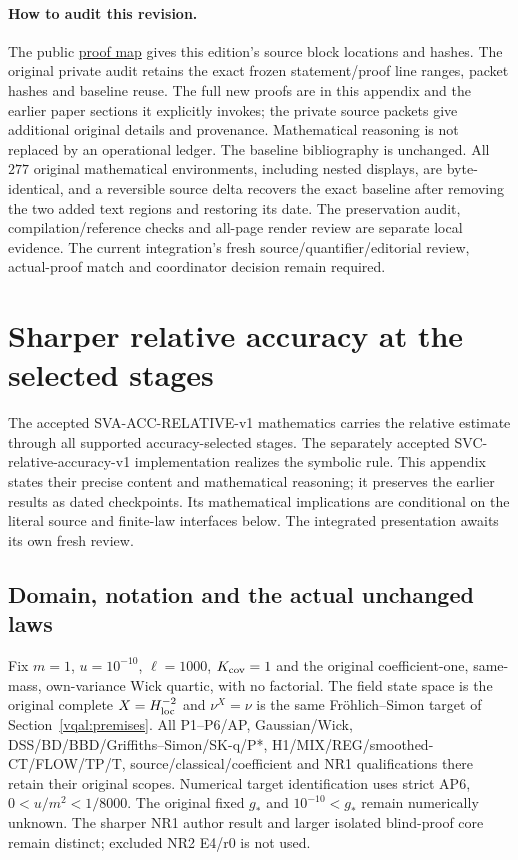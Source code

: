 \documentclass[11pt]{article}
\theoremstyle{plain}
\theoremstyle{definition}
\theoremstyle{remark}
\begin{document}
\paragraph{How to audit this revision.}
The public \href{run:PROOF-MAP.md}{proof map} gives this edition's source
block locations and hashes. The original private audit retains the exact
frozen statement/proof line ranges, packet hashes and baseline reuse. The full new proofs are in this appendix and the earlier
paper sections it explicitly invokes; the private source packets give
additional original details and provenance. Mathematical reasoning is
not replaced by an operational ledger. The baseline bibliography is
unchanged. All $277$ original mathematical environments, including
nested displays, are byte-identical, and a reversible source delta
recovers the exact baseline after removing the two added text regions
and restoring its date. The preservation audit, compilation/reference
checks and all-page render review are separate local evidence. The
current integration's fresh source/quantifier/editorial review,
actual-proof match and coordinator decision remain required.

\clearpage
\section{Sharper relative accuracy at the selected stages}
\label{sva:current}

The accepted SVA-ACC-RELATIVE-v1 mathematics carries the relative estimate
through all supported accuracy-selected stages. The separately accepted
SVC-relative-accuracy-v1 implementation realizes the symbolic rule.
This appendix states their precise content and mathematical reasoning;
it preserves the earlier results as dated checkpoints. Its mathematical
implications are conditional on the literal source and finite-law
interfaces below. The integrated presentation awaits its own fresh review.

\subsection{Domain, notation and the actual unchanged laws}
\label{sva:domain}

Fix $m=1$, $u=10^{-10}$, $\ell=1000$, $K_{\rm cov}=1$ and the original
coefficient-one, same-mass, own-variance Wick quartic, with no factorial.
The field state space is the original complete $X=H^{-2}_{\rm loc}$ and
$\nu^X=\nu$ is the same Fr\"ohlich--Simon target of
Section~\ref{vqal:premises}. All P1--P6/AP, Gaussian/Wick,
DSS/BD/BBD/Griffiths--Simon/SK-q/P*, H1/MIX/REG/smoothed-CT/FLOW/TP/T,
source/classical/coefficient and NR1 qualifications there retain their
original scopes. Numerical target identification uses strict AP6,
$0<u/m^2<1/8000$. The original fixed $g_*$ and $10^{-10}<g_*$ remain
numerically unknown. The sharper NR1 author result and larger isolated
blind-proof core remain distinct; excluded NR2 E4/r0 is not used.
\end{document}
